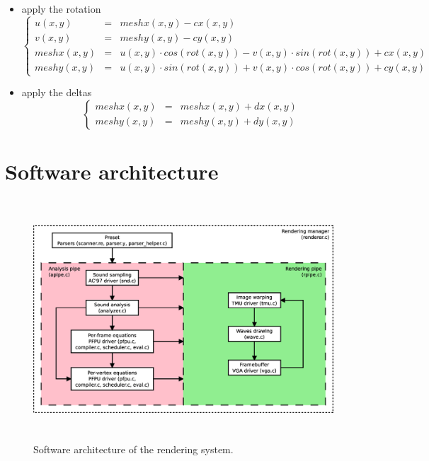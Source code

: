 \documentclass[a4paper,11pt]{article}
\begin{document}
\begin{itemize}
\item apply the rotation
\[
\left\{ \begin{array}{rrlr}
u(x, y) & = & meshx(x, y) - cx(x, y) \\
v(x, y) & = & meshy(x, y) - cy(x, y) \\
meshx(x, y) & = & u(x, y) \cdot cos(rot(x, y)) - v(x, y) \cdot sin(rot(x, y)) + cx(x, y) \\
meshy(x, y) & = & u(x, y) \cdot sin(rot(x, y)) + v(x, y) \cdot cos(rot(x, y)) + cy(x, y)
\end{array}
\right.
\]

\item apply the deltas
\[
\left\{ \begin{array}{rrlr}
meshx(x, y) & = & meshx(x, y) + dx(x, y)\\
meshy(x, y) & = & meshy(x, y) + dy(x, y)
\end{array}
\right.
\]

\end{itemize}

\section{Software architecture}
\begin{figure}[htp]
\centering
\includegraphics[height=90mm]{swarch.eps}
\caption{Software architecture of the rendering system.}\label{fig:swarch}
\end{figure}
\end{document}
